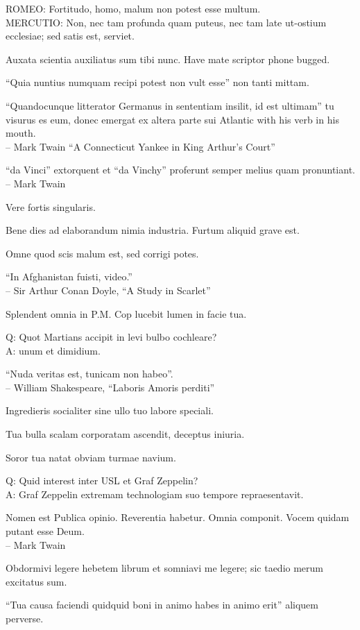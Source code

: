 \documentclass[titlepage,12pt]{memoir}
\begin{document}
ROMEO: Fortitudo, homo, malum non potest esse multum.\\
MERCUTIO: Non, nec tam profunda quam puteus, nec tam late
ut-ostium ecclesiae; sed satis est, serviet.

Auxata scientia auxiliatus sum tibi nunc. Have mate scriptor phone bugged.

“Quia nuntius numquam recipi potest non vult esse”
non tanti mittam.

“Quandocunque litterator Germanus in sententiam insilit, id est ultimam”
tu visurus es eum, donec emergat ex altera parte sui
Atlantic with his verb in his mouth.
\\-- Mark Twain “A Connecticut Yankee in King Arthur’s Court”

“da Vinci” extorquent et “da Vinchy” proferunt
semper melius quam pronuntiant.
\\-- Mark Twain

Vere fortis singularis.

Bene dies ad elaborandum nimia industria. Furtum aliquid grave est.

Omne quod scis malum est, sed corrigi potes.

 “In Afghanistan fuisti, video.”
\\-- Sir Arthur Conan Doyle, “A Study in Scarlet”

Splendent omnia in P.M. Cop lucebit lumen in facie tua.

Q: Quot Martians accipit in levi bulbo cochleare?\\
A: unum et dimidium.

“Nuda veritas est, tunicam non habeo”.
\\-- William Shakespeare, “Laboris Amoris perditi”

 Ingredieris socialiter sine ullo tuo labore speciali.

Tua bulla scalam corporatam ascendit, deceptus iniuria.

Soror tua natat obviam turmae navium.

Q: Quid interest inter USL et Graf Zeppelin?\\
A: Graf Zeppelin extremam technologiam suo tempore repraesentavit.

Nomen est Publica opinio. Reverentia habetur. Omnia componit.
Vocem quidam putant esse Deum.
\\-- Mark Twain

Obdormivi legere hebetem librum et somniavi me legere;
sic taedio merum excitatus sum.

“Tua causa faciendi quidquid boni in animo habes in animo erit”
aliquem perverse.
\end{document}
